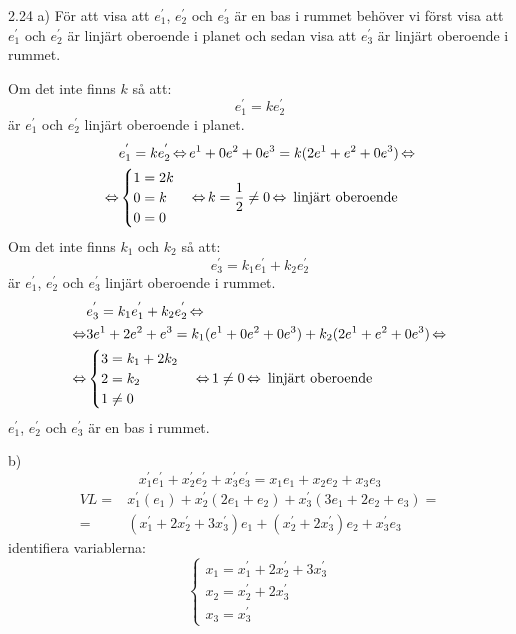\pagebreak
\begin{task}{2.24 a)}
	För att visa att $e^{'}_1$, $e^{'}_2$ och $e^{'}_3$ är en bas i rummet behöver vi först visa att  $e^{'}_1$ och $e^{'}_2$ är linjärt oberoende i planet och sedan visa att $e^{'}_3$ är linjärt oberoende i rummet.
	
	Om det inte finns $k$ så att:
	\[e^{'}_1=ke^{'}_2\]
	är $e^{'}_1$ och $e^{'}_2$ linjärt oberoende i planet.
	\begin{align*}
		&e^{'}_1=ke^{'}_2 \operatorname{\Leftrightarrow}
		e^1+0e^2+0e^3=k(2e^1+e^2+0e^3) \operatorname{\Leftrightarrow} \\ \operatorname{\Leftrightarrow}
		&\begin{cases}
			1=2k \\
			0=k \\
			0=0
		\end{cases} \operatorname{\Leftrightarrow}
		k=\frac{1}{2}\neq0 \operatorname{\Leftrightarrow}
		\text{ linjärt oberoende}
	\end{align*}
	Om det inte finns $k_1$ och $k_2$ så att:
	\[e^{'}_3=k_1e^{'}_1+k_2e^{'}_2\]
	är $e^{'}_1$, $e^{'}_2$ och $e^{'}_3$ linjärt oberoende i rummet.
	\begin{align*}
		&e^{'}_3=k_1e^{'}_1+k_2e^{'}_2 \operatorname{\Leftrightarrow} \\ \operatorname{\Leftrightarrow}
		&3e^1+2e^2+e^3=k_1(e^1+0e^2+0e^3)+k_2(2e^1+e^2+0e^3) \operatorname{\Leftrightarrow} \\ \operatorname{\Leftrightarrow}
		&\begin{cases}
			3=k_1+2k_2 \\
			2=k_2 \\
			1\neq0
		\end{cases} \operatorname{\Leftrightarrow}
		1\neq0 \operatorname{\Leftrightarrow}
		\text{ linjärt oberoende}
	\end{align*}
	\ans $e^{'}_1$, $e^{'}_2$ och $e^{'}_3$ är en bas i rummet.
\end{task}

\begin{task}{b)}
	\[x^{'}_1e^{'}_1+x^{'}_2e^{'}_2+x^{'}_3e^{'}_3=x_1e_1+x_2e_2+x_3e_3\]
	\begin{align*}
		VL=&x^{'}_1(e_1)+x^{'}_2(2e_1+e_2)+x^{'}_3(3e_1+2e_2+e_3)= \\ =
		&(x^{'}_1+2x^{'}_2+3x^{'}_3)e_1+(x^{'}_2+2x^{'}_3)e_2+x^{'}_3e_3
	\end{align*}
	identifiera variablerna:
	\[\begin{cases}
		x_1=x^{'}_1+2x^{'}_2+3x^{'}_3 \\
		x_2=x^{'}_2+2x^{'}_3 \\
		x_3=x^{'}_3
	\end{cases}\]
\end{task}

